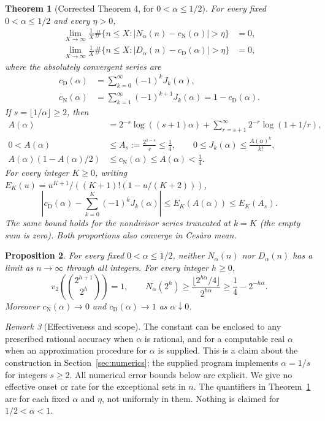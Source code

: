 \documentclass[10pt]{article}
\newtheorem{theorem}{Theorem}[section]
\newtheorem{proposition}[theorem]{Proposition}
\theoremstyle{remark}
\newtheorem{remark}[theorem]{Remark}
\newcommand{\cn}{c_{\mathrm N}}
\newcommand{\cd}{c_{\mathrm D}}
\begin{document}
\begin{theorem}[Corrected Theorem 4, for $0<\alpha\leq1/2$]
\label{thm:main}
For every fixed $0<\alpha\leq1/2$ and every $\eta>0$,
\begin{align*}
 \lim_{X\to\infty}\frac1X\#\{n\leq X:|N_\alpha(n)-\cn(\alpha)|>\eta\}&=0,\\
 \lim_{X\to\infty}\frac1X\#\{n\leq X:|D_\alpha(n)-\cd(\alpha)|>\eta\}&=0,
\end{align*}
where the absolutely convergent series are
\begin{equation}\label{eq:density}\tag{DENSITY}
 \begin{aligned}
 \cd(\alpha)&=\sum_{k=0}^{\infty}(-1)^kJ_k(\alpha),\\
 \cn(\alpha)&=\sum_{k=1}^{\infty}(-1)^{k+1}J_k(\alpha)=1-\cd(\alpha).
 \end{aligned}
\end{equation}
If $s=\lfloor1/\alpha\rfloor\geq2$, then
\begin{align}
 A(\alpha)&=2^{-s}\log((s+1)\alpha)
       +\sum_{r=s+1}^{\infty}2^{-r}\log(1+1/r),\label{eq:A}\\
 0<A(\alpha)&\leq A_s:=\frac{2^{1-s}}s\leq\frac14,
 \qquad 0\leq J_k(\alpha)\leq\frac{A(\alpha)^k}{k!},\label{eq:bounds}\\
 A(\alpha)(1-A(\alpha)/2)&\leq\cn(\alpha)\leq A(\alpha)<\frac14.
 \label{eq:bracket}
\end{align}
For every integer $K\geq0$, writing
$E_K(u)=u^{K+1}/((K+1)!(1-u/(K+2)))$,
\begin{equation}\label{eq:tail}\tag{TAIL}
 \left|\cd(\alpha)-\sum_{k=0}^K(-1)^kJ_k(\alpha)\right|
 \leq E_K(A(\alpha))\leq E_K(A_s).
\end{equation}
The same bound holds for the nondivisor series truncated at $k=K$
(the empty sum is zero). Both proportions also converge in Ces\`aro mean.
\end{theorem}

\begin{proposition}\label{prop:nolimit}
For every fixed $0<\alpha\leq1/2$, neither $N_\alpha(n)$ nor
$D_\alpha(n)$ has a limit as $n\to\infty$ through all integers.
For every integer $h\geq0$,
\[
 v_2\left(\binom{2^{h+1}}{2^h}\right)=1,\qquad
 N_\alpha(2^h)\geq\frac{\lfloor2^{h\alpha}/4\rfloor}{2^{h\alpha}}
 \geq\frac14-2^{-h\alpha}.
\]
Moreover $\cn(\alpha)\to0$ and $\cd(\alpha)\to1$ as $\alpha\downarrow0$.
\end{proposition}

\begin{remark}[Effectiveness and scope]\label{rem:scope}
The constant can be enclosed to any prescribed rational accuracy when
$\alpha$ is rational, and for a computable real $\alpha$ when an
approximation procedure for $\alpha$ is supplied. This is a claim about
the construction in Section~\ref{sec:numerics}; the supplied program
implements $\alpha=1/s$ for integers $s\geq2$. All numerical error
bounds below are explicit. We give no effective onset or rate for the
exceptional sets in $n$. The quantifiers in Theorem~\ref{thm:main} are for
each fixed $\alpha$ and $\eta$, not uniformly in them. Nothing is claimed
for $1/2<\alpha<1$.
\end{remark}
\end{document}
